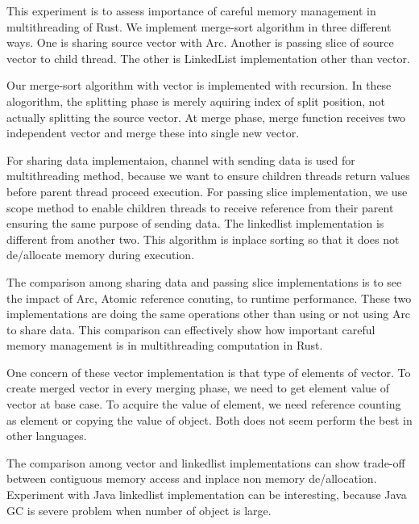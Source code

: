 This experiment is to assess importance of careful memory management in multithreading of Rust. 
We implement merge-sort algorithm in three different ways. One is sharing source vector with Arc. 
Another is passing slice of source vector to child thread. The other is LinkedList implementation other than vector.

Our merge-sort algorithm with vector is implemented with recursion. In these alogorithm, the splitting phase is merely aquiring index of split position, 
not actually splitting the source vector. At merge phase, merge function receives two independent vector and merge these into single new vector.

For sharing data implementaion, channel with sending data is used for multithreading method, because we want to ensure children threads return values before parent thread proceed execution. 
For passing slice implementation, we use scope method to enable children threads to receive reference from their parent ensuring the same purpose of sending data. 
The linkedlist implementation is different from another two. This algorithm is inplace sorting so that it does not de/allocate memory during execution. 

The comparison among sharing data and passing slice implementations is to see the impact of Arc, Atomic reference conuting, to runtime performance.
These two implementations are doing the same operations other than using or not using Arc to share data. 
This comparison can effectively show how important careful memory management is in multithreading computation in Rust.

One concern of these vector implementation is that type of elements of vector. To create merged vector in every merging phase, we need to get element value of vector at base case.
To acquire the value of element, we need reference counting as element or copying the value of object. Both does not seem perform the best in other languages.

The comparison among vector and linkedlist implementations can show trade-off between contiguous memory access and inplace non memory de/allocation. 
Experiment with Java linkedlist implementation can be interesting, because Java GC is severe problem when number of object is large. 

